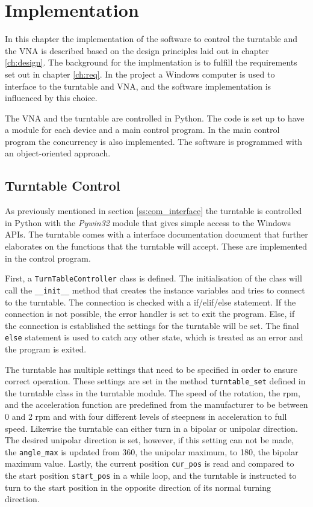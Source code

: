 \chapter{Implementation} \label{ch:implementation}
In this chapter the implementation of the software to control the turntable and the VNA is described based on the design principles laid out in chapter \ref{ch:design}. The background for the implmentation is to fulfill the requirements set out in chapter \ref{ch:req}. In the project a Windows computer is used to interface to the turntable and VNA, and the software implementation is influenced by this choice.

The VNA and the turntable are controlled in Python. The code is set up to have a module for each device and a main control program. In the main control program the concurrency is also implemented. The software is programmed with an object-oriented approach.

\section{Turntable Control}
As previously mentioned in section \ref{ss:com_interface} the turntable is controlled in Python with the \textit{Pywin32} module that gives simple access to the Windows APIs. The turntable comes with a interface documentation document that further elaborates on the functions that the turntable will accept. These are implemented in the control program. 

First, a \verb+TurnTableController+ class is defined. The initialisation of the class will call the \verb+__init__+ method that creates the instance variables and tries to connect to the turntable. The connection is checked with a if/elif/else statement. If the connection is not possible, the error handler is set to exit the program. Else, if the connection is established the settings for the turntable will be set. The final \verb+else+ statement is used to catch any other state, which is treated as an error and the program is exited.

The turntable has multiple settings that need to be specified in order to ensure correct operation. These settings are set in the method \verb+turntable_set+ defined in the turntable class in the turntable module. The speed of the rotation, the rpm, and the acceleration function are predefined from the manufacturer to be between 0 and 2 rpm and with four different levels of steepness in acceleration to full speed. Likewise the turntable can either turn in a bipolar or unipolar direction. The desired unipolar direction is set, however, if this setting can not be made, the \verb+angle_max+ is updated from 360, the unipolar maximum, to 180, the bipolar maximum value. Lastly, the current position \verb+cur_pos+ is read and compared to the start position \verb+start_pos+ in a while loop, and the turntable is instructed to turn to the start position in the opposite direction of its normal turning direction.


